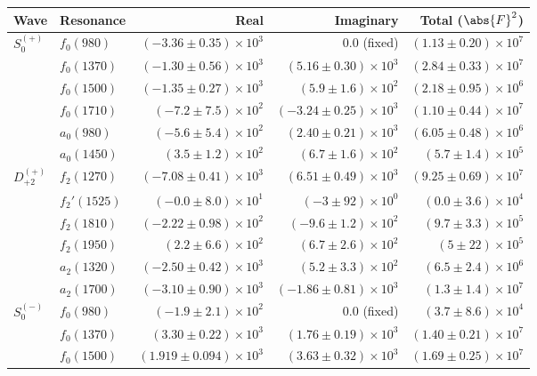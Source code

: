 \begin{table}
    \begin{center}
        \begin{tabular}{llrrr}\toprule
        Wave & Resonance & Real & Imaginary & Total ($\abs{F}^2$) \\\midrule
$S_{0}^{(+)}$ & $f_{0}(980)$ & $(-3.36 \pm 0.35) \times 10^{3}$ & $0.0$ (fixed) & $(1.13 \pm 0.20) \times 10^{7}$ \\
 & $f_{0}(1370)$ & $(-1.30 \pm 0.56) \times 10^{3}$ & $(5.16 \pm 0.30) \times 10^{3}$ & $(2.84 \pm 0.33) \times 10^{7}$ \\
 & $f_{0}(1500)$ & $(-1.35 \pm 0.27) \times 10^{3}$ & $(5.9 \pm 1.6) \times 10^{2}$ & $(2.18 \pm 0.95) \times 10^{6}$ \\
 & $f_{0}(1710)$ & $(-7.2 \pm 7.5) \times 10^{2}$ & $(-3.24 \pm 0.25) \times 10^{3}$ & $(1.10 \pm 0.44) \times 10^{7}$ \\
 & $a_{0}(980)$ & $(-5.6 \pm 5.4) \times 10^{2}$ & $(2.40 \pm 0.21) \times 10^{3}$ & $(6.05 \pm 0.48) \times 10^{6}$ \\
 & $a_{0}(1450)$ & $(3.5 \pm 1.2) \times 10^{2}$ & $(6.7 \pm 1.6) \times 10^{2}$ & $(5.7 \pm 1.4) \times 10^{5}$ \\
$D_{+2}^{(+)}$ & $f_{2}(1270)$ & $(-7.08 \pm 0.41) \times 10^{3}$ & $(6.51 \pm 0.49) \times 10^{3}$ & $(9.25 \pm 0.69) \times 10^{7}$ \\
 & $f_{2}'(1525)$ & $(-0.0 \pm 8.0) \times 10^{1}$ & $(-3 \pm 92) \times 10^{0}$ & $(0.0 \pm 3.6) \times 10^{4}$ \\
 & $f_{2}(1810)$ & $(-2.22 \pm 0.98) \times 10^{2}$ & $(-9.6 \pm 1.2) \times 10^{2}$ & $(9.7 \pm 3.3) \times 10^{5}$ \\
 & $f_{2}(1950)$ & $(2.2 \pm 6.6) \times 10^{2}$ & $(6.7 \pm 2.6) \times 10^{2}$ & $(5 \pm 22) \times 10^{5}$ \\
 & $a_{2}(1320)$ & $(-2.50 \pm 0.42) \times 10^{3}$ & $(5.2 \pm 3.3) \times 10^{2}$ & $(6.5 \pm 2.4) \times 10^{6}$ \\
 & $a_{2}(1700)$ & $(-3.10 \pm 0.90) \times 10^{3}$ & $(-1.86 \pm 0.81) \times 10^{3}$ & $(1.3 \pm 1.4) \times 10^{7}$ \\
$S_{0}^{(-)}$ & $f_{0}(980)$ & $(-1.9 \pm 2.1) \times 10^{2}$ & $0.0$ (fixed) & $(3.7 \pm 8.6) \times 10^{4}$ \\
 & $f_{0}(1370)$ & $(3.30 \pm 0.22) \times 10^{3}$ & $(1.76 \pm 0.19) \times 10^{3}$ & $(1.40 \pm 0.21) \times 10^{7}$ \\
 & $f_{0}(1500)$ & $(1.919 \pm 0.094) \times 10^{3}$ & $(3.63 \pm 0.32) \times 10^{3}$ & $(1.69 \pm 0.25) \times 10^{7}$ \\

\end{tabular}
\end{center}
\end{table}
